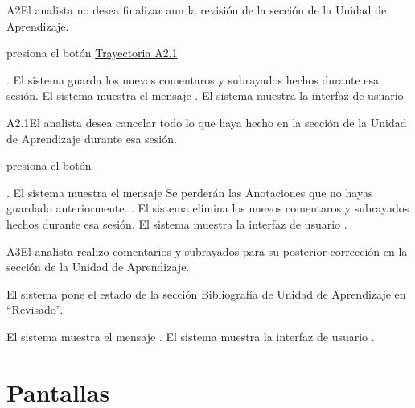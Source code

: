 	
\begin{UCtrayectoriaA}{A2}{El analista no desea finalizar aun la revisión de la sección de la Unidad de Aprendizaje.}

    \hypertarget{SP2-CU10-A2}{\UCpaso[\UCactor] presiona el botón  \hyperlink{SP2-CU10-A2.1}{Trayectoria A2.1}}. 
    \UCpaso El sistema guarda los nuevos comentaros y subrayados hechos durante esa sesión.
    \UCpaso El sistema muestra el mensaje .
    \UCpaso El sistema muestra la interfaz de usuario 
\end{UCtrayectoriaA}

\begin{UCtrayectoriaA}{A2.1}{El analista desea cancelar todo lo que haya hecho en la sección de la Unidad de Aprendizaje durante esa sesión.}

	\hypertarget{SP2-CU10-A2.1}{\UCpaso[\UCactor] presiona el botón }. 
    \UCpaso El sistema muestra el mensaje 
Se perderán las Anotaciones que no hayas guardado anteriormente. .
    \UCpaso El sistema elimina los nuevos comentaros y subrayados hechos durante esa sesión.
    \UCpaso El sistema muestra la interfaz de usuario .
\end{UCtrayectoriaA}

	
\begin{UCtrayectoriaA}{A3}{El analista realizo comentarios y subrayados para su posterior corrección en la sección de la Unidad de Aprendizaje.} 

	\hypertarget{SP2-CU10-A3}{\UCpaso El sistema pone el estado de la sección Bibliografía de Unidad de Aprendizaje en “Revisado”.}
    \UCpaso El sistema muestra el mensaje .
    \UCpaso El sistema muestra la interfaz de usuario .
\end{UCtrayectoriaA}

\chapter{Pantallas}

